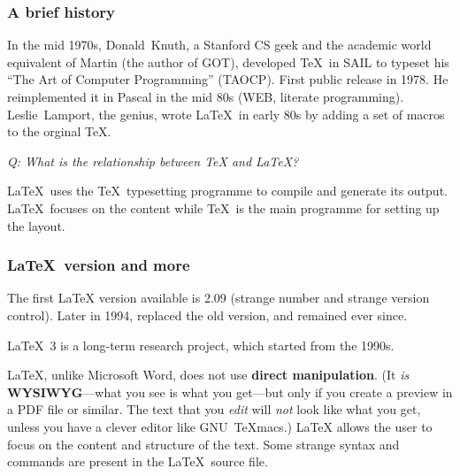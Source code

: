 \documentclass[11pt]{beamer}
\begin{document}
\begin{frame}
	\frametitle{A brief history}

	In the mid 1970s, Donald~Knuth, a Stanford CS geek and the academic world equivalent of Martin (the author of GOT), developed \TeX \ in SAIL to typeset his ``The Art of Computer Programming'' (TAOCP). First public release in 1978. He reimplemented it in Pascal in the mid 80s (WEB, literate programming).  Leslie~Lamport, the genius, wrote \LaTeX \ in early 80s by adding a set of macros to the orginal \TeX. 
	
	\bigskip
	
\textit{Q: What is the relationship between \TeX \xspace and \LaTeX? }
	
	\LaTeX \ uses the \TeX \ typesetting programme to compile and generate its output. \LaTeX \ focuses on the content while \TeX \ is the main programme for setting up the layout.

\end{frame}

\begin{frame}
	\frametitle{\LaTeX \ version and more}
	
	The first \LaTeX\xspace version available is 2.09 (strange number and strange version control). Later in 1994, \LaTeXe\xspace replaced the old version, and remained ever since. 
	
	\bigskip
	
	\LaTeX \ 3 is a long-term research project, which started from the 1990s.
	
	\bigskip
	
	\LaTeX, unlike Microsoft Word, does not use \textbf{direct manipulation}.  (It {\em is} \textbf{WYSIWYG}---what you see is what you get---but only if you create a preview in a PDF file or similar.  The text that you {\em edit} will {\em not} look like what you get, unless you have a clever editor like GNU~TeXmacs.)  \LaTeX{} allows the user to focus on the content and structure of the text. Some strange syntax and commands are present in the \LaTeX \ source file. 
	
\end{frame}
\end{document}
